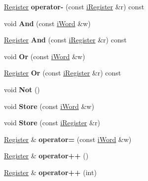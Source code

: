 \begin{DoxyCompactItemize}
\item 
\hypertarget{classRegister_a43c957e4b6a3103f0634258891c82b46}{
\hyperlink{classRegister}{Register} {\bfseries operator-\/} (const \hyperlink{classiRegister}{iRegister} \&r) const }
\label{classRegister_a43c957e4b6a3103f0634258891c82b46}

\item 
\hypertarget{classRegister_a312263efb06ef459409879f5119b3b81}{
void {\bfseries And} (const \hyperlink{classiWord}{iWord} \&w)}
\label{classRegister_a312263efb06ef459409879f5119b3b81}

\item 
\hypertarget{classRegister_af3502239502c214b8c9362a6fd9f8ff8}{
\hyperlink{classRegister}{Register} {\bfseries And} (const \hyperlink{classiRegister}{iRegister} \&r) const }
\label{classRegister_af3502239502c214b8c9362a6fd9f8ff8}

\item 
\hypertarget{classRegister_ab2f8407fab157d8deea936fa74424115}{
void {\bfseries Or} (const \hyperlink{classiWord}{iWord} \&w)}
\label{classRegister_ab2f8407fab157d8deea936fa74424115}

\item 
\hypertarget{classRegister_a9400801cc625144c4606cd7f5cbbaa21}{
\hyperlink{classRegister}{Register} {\bfseries Or} (const \hyperlink{classiRegister}{iRegister} \&r) const }
\label{classRegister_a9400801cc625144c4606cd7f5cbbaa21}

\item 
\hypertarget{classRegister_abbf5f6793328db8b28845cac84c0e82d}{
void {\bfseries Not} ()}
\label{classRegister_abbf5f6793328db8b28845cac84c0e82d}

\item 
\hypertarget{classRegister_affcc16cc88cdc896803b1ab6af5d38e0}{
void {\bfseries Store} (const \hyperlink{classiWord}{iWord} \&w)}
\label{classRegister_affcc16cc88cdc896803b1ab6af5d38e0}

\item 
\hypertarget{classRegister_a2ac7bd6f2e0eb38800c0a8c8d045e18e}{
void {\bfseries Store} (const \hyperlink{classiRegister}{iRegister} \&r)}
\label{classRegister_a2ac7bd6f2e0eb38800c0a8c8d045e18e}

\item 
\hypertarget{classRegister_afc5f775405700146638e392d81ad7d0b}{
\hyperlink{classRegister}{Register} \& {\bfseries operator=} (const \hyperlink{classiWord}{iWord} \&w)}
\label{classRegister_afc5f775405700146638e392d81ad7d0b}

\item 
\hypertarget{classRegister_ac4e78cff131bc5c69695a9db5ca35255}{
\hyperlink{classRegister}{Register} \& {\bfseries operator++} ()}
\label{classRegister_ac4e78cff131bc5c69695a9db5ca35255}

\item 
\hypertarget{classRegister_ae3414befdccf70a18df0f67dc19d86b7}{
\hyperlink{classRegister}{Register} \& {\bfseries operator++} (int)}
\label{classRegister_ae3414befdccf70a18df0f67dc19d86b7}

\end{DoxyCompactItemize}
